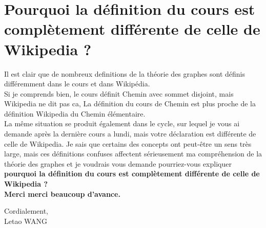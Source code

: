 \documentclass{fphw}
\begin{document}
\section{Pourquoi la définition du cours est complètement différente de celle de Wikipedia ? }
Il est clair que de nombreux definitions de la théorie des graphes sont définis différemment dans le cours et dans Wikipédia.\\

Si je comprends bien, le cours définit Chemin avec sommet disjoint, mais Wikipedia ne dit pas ca, La définition du cours de Chemin est plus proche de la définition Wikipedia du Chemin élémentaire.\\

La même situation se produit également dans le cycle, sur lequel je vous ai demande après la dernière cours a lundi, mais votre déclaration est différente de celle de Wikipedia. Je sais que certains des concepts ont peut-être un sens très large, mais ces définitions confuses affectent sérieusement ma compréhension de la théorie des graphes et je voudrais vous demande pourriez-vous expliquer \textbf{pourquoi la définition du cours est complètement différente de celle de Wikipedia ?}\\

\textbf{Merci merci beaucoup d'avance.}

Cordialement,\\
Letao WANG
\end{document}
